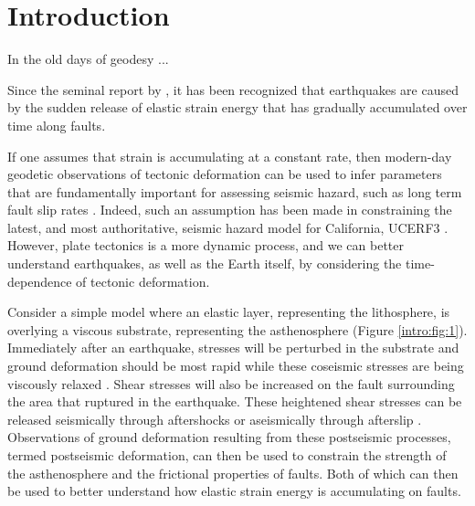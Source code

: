 \chapter{Introduction}


In the old days of geodesy ...



Since the seminal report by \citet{Reid1910}, it has been recognized
that earthquakes are caused by the sudden release of elastic strain
energy that has gradually accumulated over time along faults. 



If one assumes that strain is accumulating at a constant
rate, then modern-day geodetic observations of tectonic deformation
can be used to infer parameters that are fundamentally important for
assessing seismic hazard, such as long term fault slip rates
\citep[e.g.,][]{Savage1973,Meade2005}. Indeed, such an assumption has
been made in constraining the latest, and most authoritative, seismic
hazard model for California, UCERF3 \citep{Field2014}. However, plate
tectonics is a more dynamic process, and we can better understand
earthquakes, as well as the Earth itself, by considering the
time-dependence of tectonic deformation.

Consider a simple model where an elastic layer, representing the
lithosphere, is overlying a viscous substrate, representing the
asthenosphere (Figure \ref{intro:fig:1}). Immediately after an
earthquake, stresses will be perturbed in the substrate and ground
deformation should be most rapid while these coseismic stresses are
being viscously relaxed \citep{Nur1974,Savage1978}. Shear stresses
will also be increased on the fault surrounding the area that ruptured
in the earthquake. These heightened shear stresses can be released
seismically through aftershocks or aseismically through afterslip
\citep{Marone1991}. Observations of ground deformation resulting from
these postseismic processes, termed postseismic deformation, can then
be used to constrain the strength of the asthenosphere and the
frictional properties of faults. Both of which can then be used to
better understand how elastic strain energy is accumulating on faults.

